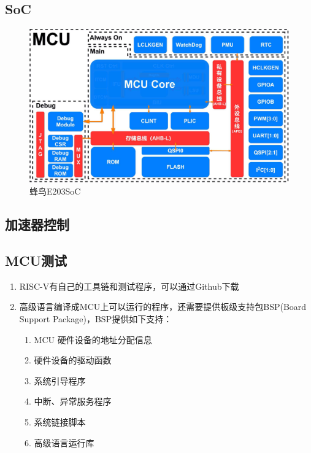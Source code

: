 \documentclass{article}
\begin{document}
\subsection{SoC}
\begin{figure}[H]
\begin{center}
  \includegraphics[width=\textwidth]{soc}
\end{center}
\caption{蜂鸟E203SoC}
\label{fig: SoC1}
\end{figure}

\subsection{加速器控制}
\subsection{MCU测试}
\begin{enumerate}
  \item RISC-V有自己的工具链和测试程序，可以通过Github下载\cite{riscv1}
  \item 高级语言编译成MCU上可以运行的程序，还需要提供板级支持包BSP(Board Support Package)\cite{riscv1}，BSP提供如下支持：
    \begin{enumerate}
      \item MCU 硬件设备的地址分配信息
      \item 硬件设备的驱动函数
      \item 系统引导程序
      \item 中断、异常服务程序
      \item 系统链接脚本
      \item 高级语言运行库
    \end{enumerate}
\end{enumerate}




\newpage
\end{document}
